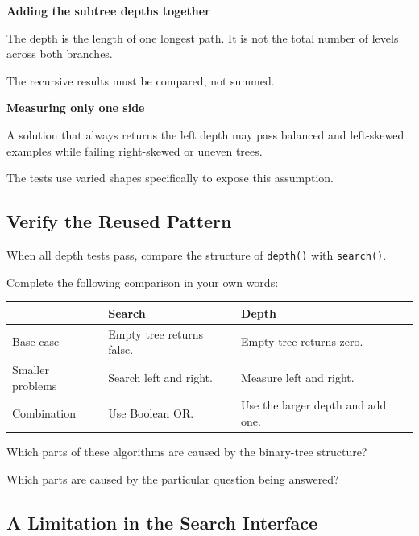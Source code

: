 \documentclass{csc2059practical}
\begin{document}
\begin{commonerror}
\textbf{Adding the subtree depths together}

The depth is the length of one longest path. It is not the total number of
levels across both branches.

The recursive results must be compared, not summed.
\end{commonerror}

\begin{commonerror}
\textbf{Measuring only one side}

A solution that always returns the left depth may pass balanced and left-skewed
examples while failing right-skewed or uneven trees.

The tests use varied shapes specifically to expose this assumption.
\end{commonerror}

\subsection{Verify the Reused Pattern}

When all depth tests pass, compare the structure of
\texttt{depth()} with \texttt{search()}.

Complete the following comparison in your own words:

\begin{center}
\begin{tabular}{p{} p{} p{}}
\toprule
& \textbf{Search} & \textbf{Depth} \\
\midrule
Base case &
Empty tree returns false. &
Empty tree returns zero. \\
Smaller problems &
Search left and right. &
Measure left and right. \\
Combination &
Use Boolean OR. &
Use the larger depth and add one. \\
\bottomrule
\end{tabular}
\end{center}

\begin{reflectionbox}
Which parts of these algorithms are caused by the binary-tree structure?

Which parts are caused by the particular question being answered?
\end{reflectionbox}

\subsection{A Limitation in the Search Interface}
\end{document}
